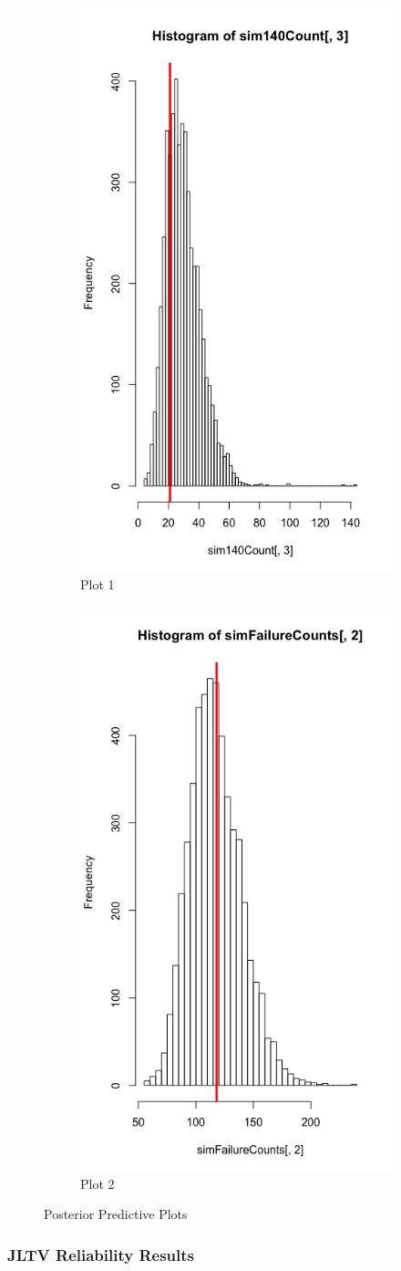 \documentclass[12pt]{article}
\begin{document}
\begin{figure}
\centering
\begin{subfigure}{.5\textwidth}
  \centering
  \includegraphics[width=.4\linewidth]{Rplot1}
  \caption{Plot 1}
  \label{fig:sub1}
\end{subfigure}%
\begin{subfigure}{.5\textwidth}
  \centering
  \includegraphics[width=.4\linewidth]{Rplot2}
  \caption{Plot 2}
  \label{fig:sub2}
\end{subfigure}
\caption{Posterior Predictive Plots}
\label{fig:test}
\end{figure}

\subsubsection{JLTV Reliability Results}
\end{document}
